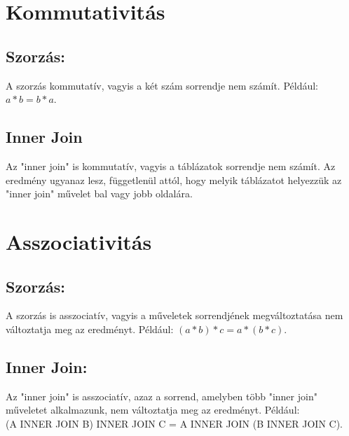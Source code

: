 \documentclass[]{article}
\title{}
\author{}
\begin{document}
\section{Kommutativitás}
	\subsection*{Szorzás:}
		A szorzás kommutatív, vagyis a két szám sorrendje nem számít. Például: $a * b = b * a$.
	\subsection*{Inner Join}
		Az "inner join" is kommutatív, vagyis a táblázatok sorrendje nem számít. Az eredmény ugyanaz lesz, függetlenül attól, hogy melyik táblázatot helyezzük az "inner join" művelet bal vagy jobb oldalára.

\section{Asszociativitás}
	\subsection{Szorzás:}
		A szorzás is asszociatív, vagyis a műveletek sorrendjének megváltoztatása nem változtatja meg az eredményt. Például: $(a * b) * c = a * (b * c)$.
	\subsection{Inner Join:}
		Az "inner join" is asszociatív, azaz a sorrend, amelyben több "inner join" műveletet alkalmazunk, nem változtatja meg az eredményt. Például:\\ (A INNER JOIN B) INNER JOIN C = A INNER JOIN (B INNER JOIN C).
\end{document}
